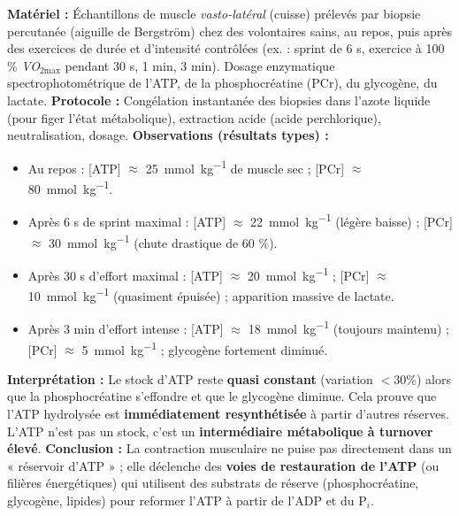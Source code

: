 \documentclass[11pt]{article}
\begin{document}
\begin{experience}
\textbf{Matériel :} Échantillons de muscle \emph{vasto-latéral} (cuisse) prélevés par biopsie percutanée (aiguille de Bergström) chez des volontaires sains, au repos, puis après des exercices de durée et d'intensité contrôlées (ex. : sprint de 6 s, exercice à 100 \% \emph{VO}$_{2\text{max}}$ pendant 30 s, 1 min, 3 min). Dosage enzymatique spectrophotométrique de l'ATP, de la phosphocréatine (PCr), du glycogène, du lactate.
\textbf{Protocole :} Congélation instantanée des biopsies dans l'azote liquide (pour figer l'état métabolique), extraction acide (acide perchlorique), neutralisation, dosage.
\textbf{Observations (résultats types) :}
\begin{itemize}
    \item Au repos : [ATP] $\approx$ \SI{25}{\milli\mole\per\kilo\gram} de muscle sec ; [PCr] $\approx$ \SI{80}{\milli\mole\per\kilo\gram}.
    \item Après 6 s de sprint maximal : [ATP] $\approx$ \SI{22}{\milli\mole\per\kilo\gram} (légère baisse) ; [PCr] $\approx$ \SI{30}{\milli\mole\per\kilo\gram} (chute drastique de 60 \%).
    \item Après 30 s d'effort maximal : [ATP] $\approx$ \SI{20}{\milli\mole\per\kilo\gram} ; [PCr] $\approx$ \SI{10}{\milli\mole\per\kilo\gram} (quasiment épuisée) ; apparition massive de lactate.
    \item Après 3 min d'effort intense : [ATP] $\approx$ \SI{18}{\milli\mole\per\kilo\gram} (toujours maintenu) ; [PCr] $\approx$ \SI{5}{\milli\mole\per\kilo\gram} ; glycogène fortement diminué.
\end{itemize}
\textbf{Interprétation :} Le stock d'ATP reste \textbf{quasi constant} (variation $< 30\%$) alors que la phosphocréatine s'effondre et que le glycogène diminue. Cela prouve que l'ATP hydrolysée est \textbf{immédiatement resynthétisée} à partir d'autres réserves. L'ATP n'est pas un stock, c'est un \textbf{intermédiaire métabolique à turnover élevé}.
\textbf{Conclusion :} La contraction musculaire ne puise pas directement dans un « réservoir d'ATP » ; elle déclenche des \textbf{voies de restauration de l'ATP} (ou filières énergétiques) qui utilisent des substrats de réserve (phosphocréatine, glycogène, lipides) pour reformer l'ATP à partir de l'ADP et du P$_i$.
\end{experience}
\end{document}
